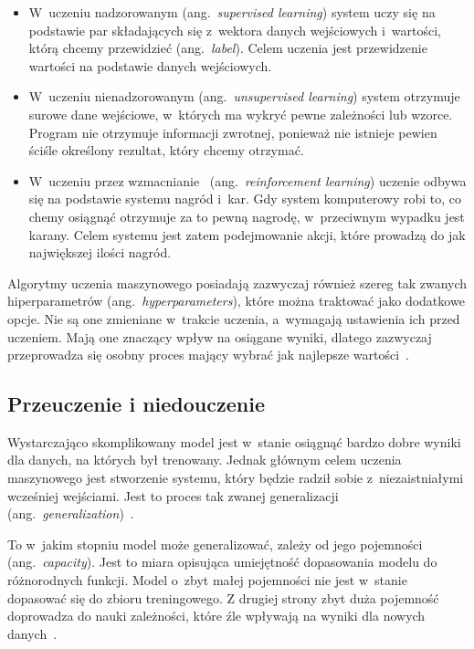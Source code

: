 \begin{itemize}
    \item W~uczeniu nadzorowanym (ang.~\textit{supervised learning}) system uczy się na podstawie par składających się z~wektora danych wejściowych i~wartości, którą chcemy przewidzieć (ang.~\textit{label}).
    Celem uczenia jest przewidzenie wartości na podstawie danych wejściowych.

    \item W~uczeniu nienadzorowanym (ang.~\textit{unsupervised learning}) system otrzymuje surowe dane wejściowe, w~których ma wykryć pewne zależności lub wzorce.
    Program nie otrzymuje informacji zwrotnej, ponieważ nie istnieje pewien ściśle określony rezultat, który chcemy otrzymać.

    \item W~uczeniu przez wzmacnianie~ (ang.~\textit{reinforcement learning}) uczenie odbywa się na podstawie systemu nagród i~kar.
    Gdy system komputerowy robi to, co chemy osiągnąć otrzymuje za to pewną nagrodę, w~przeciwnym wypadku jest karany.
    Celem systemu jest zatem podejmowanie akcji, które prowadzą do jak największej ilości nagród.
\end{itemize}

Algorytmy uczenia maszynowego posiadają zazwyczaj również szereg tak zwanych hiperparametrów (ang.~\textit{hyperparameters}), które można traktować jako dodatkowe opcje.
Nie są one zmieniane w~trakcie uczenia, a~wymagają ustawienia ich przed uczeniem.
Mają one znaczący wpływ na osiągane wyniki, dlatego zazwyczaj przeprowadza się osobny proces mający wybrać jak najlepsze wartości~\cite{Goodfellow2016}.

\subsection{Przeuczenie i niedouczenie}\label{subsec:przeuczenie-i-niedouczenie}

Wystarczająco skomplikowany model jest w~stanie osiągnąć bardzo dobre wyniki dla danych, na których był trenowany.
Jednak głównym celem uczenia maszynowego jest stworzenie systemu, który będzie radził sobie z~niezaistniałymi wcześniej wejściami.
Jest to proces tak zwanej generalizacji (ang.~\textit{generalization})~\cite{Goodfellow2016}.

To w~jakim stopniu model może generalizować, zależy od jego pojemności (ang.~\textit{capacity}).
Jest to miara opisująca umiejętność dopasowania modelu do różnorodnych funkcji.
Model o~zbyt małej pojemności nie jest w~stanie dopasować się do zbioru treningowego.
Z drugiej strony zbyt duża pojemność doprowadza do nauki zależności, które źle wpływają na wyniki dla nowych danych~\cite{Goodfellow2016}.

